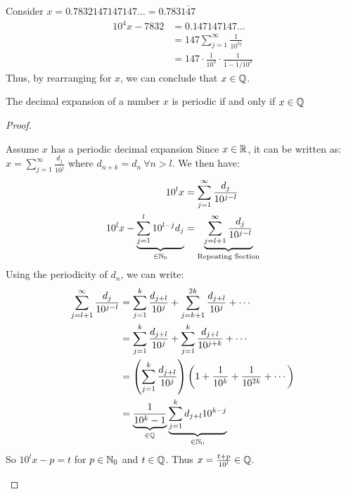 \documentclass[../main.tex]{subfiles}
\begin{document}
\begin{example}
  Consider $x = 0.7832147147147\ldots = 0.783\overline{147}$
  \begin{align*}
    10^{4}x - 7832 &= 0.147147147\ldots \\
                   &= 147 \sum_{j = 1}^{\infty} \frac{1}{10^{3j}} \\
                   &= 147 \cdot \frac{1}{10^{3}} \cdot \frac{1}{1-1/10^{3}}
  \end{align*}
  Thus, by rearranging for $x$, we can conclude that $x \in \mathbb{Q}$.
\end{example}
\begin{proposition}
  The decimal expansion of a number $x$ is periodic if and only if $x \in \mathbb{Q}$
\end{proposition}
\begin{proof}
  \begin{proofdirection}{Assume $x$ has a periodic decimal expansion}
    Since $x \in \mathbb{R}$, it can be written as: $x = \sum_{j = 1}^{\infty} \frac{d_j}{10^{j}}$ where $d_{n + k} = d_n\ \forall n > l$.
    We then have:
    \begin{align*}
      10^{l}x &= \sum_{j = 1}^{\infty} \frac{d_j}{10^{j - l}} \\
      10^{l}x - \underbrace{\sum_{j = 1}^{l}  10^{l - j}d_j}_{\in \mathbb{N}_0} &= \underbrace{\sum_{j = l + 1}^{\infty} \frac{d_j}{10^{j - l}}}_{\text{Repeating Section}}
    \end{align*}
    Using the periodicity of $d_n$, we can write:
    \begin{align*}
      \sum_{j = l + 1}^{\infty} \frac{d_j}{10^{j - l}} &= \sum_{j = 1}^{k} \frac{d_{j + l}}{10^{j}} + \sum_{j = k + 1}^{2k} \frac{d_{j + l}}{10^{j}} + \cdots \\
                                                       &= \sum_{j = 1}^{k} \frac{d_{j + l}}{10^{j}} + \sum_{j = 1}^{k} \frac{d_{j + l}}{10^{j + k}} + \cdots \\
                                                       &= \left(\sum_{j = 1}^{k} \frac{d_{j + l}}{10^{j}}\right)\left(1 + \frac{1}{10^{k}} + \frac{1}{10^{2k}} + \cdots\right) \\
                                                       &= \underbrace{\frac{1}{10^{k} - 1}}_{\in \mathbb{Q}}\underbrace{\sum_{j=1}^{k} d_{j + l}10^{k - j}}_{\in \mathbb{N}_0}
    \end{align*}
    So $10^{l}x - p = t$ for $p \in \mathbb{N}_0$ and $t \in \mathbb{Q}$.
    Thus $x = \frac{t + p}{10^{l}} \in \mathbb{Q}$.
  \end{proofdirection}

\end{proof}
\end{document}
